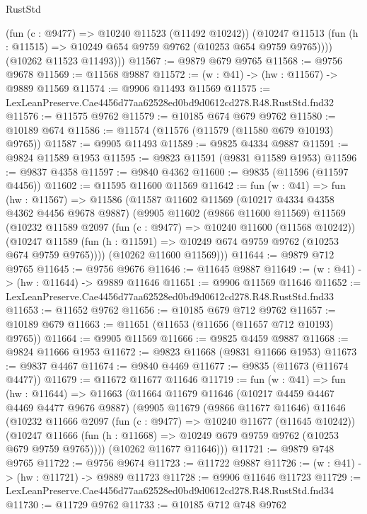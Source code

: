 \begin{lexlean}{RustStd}
\begin{coremodule}
          (fun (c : @9477) => @10240 @11523 (@11492 @10242))
          (@10247 @11513 (fun (h : @11515) => @10249 @654 @9759 @9762 (@10253 @654 @9759 @9765))))
        (@10262 @11523 @11493)))
@11567 := @9879 @679 @9765
@11568 := @9756 @9678
@11569 := @11568 @9887
@11572 := (w : @41) -> (hw : @11567) -> @9889 @11569
@11574 := @9906 @11493 @11569
@11575 := LexLeanPreserve.Cae4456d77aa62528ed0bd9d0612cd278.R48.RustStd.fnd32
@11576 := @11575 @9762
@11579 := @10185 @674 @679 @9762
@11580 := @10189 @674
@11586 := @11574 (@11576 (@11579 (@11580 @679 @10193) @9765))
@11587 := @9905 @11493
@11589 := @9825 @4334 @9887
@11591 := @9824 @11589 @1953
@11595 := @9823 @11591 (@9831 @11589 @1953)
@11596 := @9837 @4358
@11597 := @9840 @4362
@11600 := @9835 (@11596 (@11597 @4456))
@11602 := @11595 @11600 @11569
@11642 := fun (w : @41) =>
  fun (hw : @11567) =>
  @11586
    (@11587
      @11602
      @11569
      (@10217 @4334 @4358 @4362 @4456 @9678 @9887)
      (@9905
        @11602
        (@9866 @11600 @11569)
        @11569
        (@10232
          @11589
          @2097
          (fun (c : @9477) => @10240 @11600 (@11568 @10242))
          (@10247 @11589 (fun (h : @11591) => @10249 @674 @9759 @9762 (@10253 @674 @9759 @9765))))
        (@10262 @11600 @11569)))
@11644 := @9879 @712 @9765
@11645 := @9756 @9676
@11646 := @11645 @9887
@11649 := (w : @41) -> (hw : @11644) -> @9889 @11646
@11651 := @9906 @11569 @11646
@11652 := LexLeanPreserve.Cae4456d77aa62528ed0bd9d0612cd278.R48.RustStd.fnd33
@11653 := @11652 @9762
@11656 := @10185 @679 @712 @9762
@11657 := @10189 @679
@11663 := @11651 (@11653 (@11656 (@11657 @712 @10193) @9765))
@11664 := @9905 @11569
@11666 := @9825 @4459 @9887
@11668 := @9824 @11666 @1953
@11672 := @9823 @11668 (@9831 @11666 @1953)
@11673 := @9837 @4467
@11674 := @9840 @4469
@11677 := @9835 (@11673 (@11674 @4477))
@11679 := @11672 @11677 @11646
@11719 := fun (w : @41) =>
  fun (hw : @11644) =>
  @11663
    (@11664
      @11679
      @11646
      (@10217 @4459 @4467 @4469 @4477 @9676 @9887)
      (@9905
        @11679
        (@9866 @11677 @11646)
        @11646
        (@10232
          @11666
          @2097
          (fun (c : @9477) => @10240 @11677 (@11645 @10242))
          (@10247 @11666 (fun (h : @11668) => @10249 @679 @9759 @9762 (@10253 @679 @9759 @9765))))
        (@10262 @11677 @11646)))
@11721 := @9879 @748 @9765
@11722 := @9756 @9674
@11723 := @11722 @9887
@11726 := (w : @41) -> (hw : @11721) -> @9889 @11723
@11728 := @9906 @11646 @11723
@11729 := LexLeanPreserve.Cae4456d77aa62528ed0bd9d0612cd278.R48.RustStd.fnd34
@11730 := @11729 @9762
@11733 := @10185 @712 @748 @9762

\end{coremodule}
\end{lexlean}
